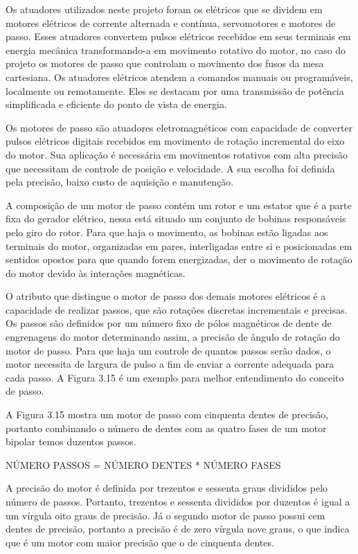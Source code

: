 Os atuadores utilizados neste projeto foram os elétricos que se dividem em  motores elétricos de corrente alternada 
e contínua, servomotores e motores de passo. Esses atuadores convertem pulsos elétricos recebidos em seus terminais 
em energia mecânica transformando-a em movimento rotativo do motor, no caso do projeto os motores de passo que controlam 
o movimento dos fusos da mesa cartesiana. Os atuadores elétricos atendem a comandos manuais ou programáveis, localmente 
ou remotamente. Eles se destacam por uma transmissão de potência simplificada e eficiente do ponto de vista de energia.

Os motores de passo são atuadores eletromagnéticos com capacidade de converter pulsos elétricos digitais recebidos em 
movimento de rotação incremental do eixo do motor. Sua aplicação é necessária em movimentos rotativos com alta precisão 
que necessitam de controle de posição e velocidade. A sua escolha foi definida pela precisão, baixo custo de aquisição 
e manutenção.

A composição de um motor de passo contém um rotor e um estator que é a parte fixa do gerador elétrico, nessa está 
situado um conjunto de bobinas responsáveis pelo giro do rotor. Para que haja o movimento, as bobinas estão ligadas 
aos terminais do motor, organizadas em pares, interligadas entre si e posicionadas em sentidos opostos para que 
quando forem energizadas, der o movimento de rotação do motor devido às interações magnéticas.

O atributo que distingue o motor de passo dos demais motores elétricos é a capacidade de realizar passos, que são 
rotações discretas incrementais e precisas. Os passos são definidos por um número fixo de pólos magnéticos de dente 
de engrenagens do motor determinando assim, a precisão de ângulo de rotação do motor de passo. Para que haja um 
controle de quantos passos serão dados, o motor necessita de largura de pulso a fim de enviar a corrente adequada 
para cada passo. A Figura 3.15 é um exemplo para melhor entendimento do conceito de passo.


A Figura 3.15 mostra um motor de passo com cinquenta dentes de precisão, portanto combinando o número de dentes 
com as quatro fases de um motor bipolar temos duzentos passos.

NÚMERO PASSOS = NÚMERO DENTES * NÚMERO FASES

A precisão do motor é definida por trezentos e sessenta graus divididos pelo número de passos. Portanto, 
trezentos e sessenta divididos por duzentos é igual a um vírgula oito graus de precisão. Já o segundo motor 
de passo possui cem dentes de precisão, portanto a precisão é de zero vírgula nove graus, o que indica que 
é um motor com maior precisão que o de cinquenta dentes.

